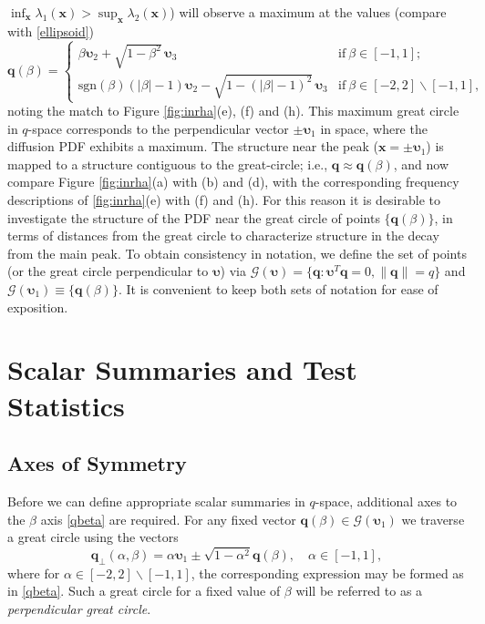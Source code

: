 \documentclass[dvips,aoas,preprint]{imsart}
\numberwithin{equation}{section}
\theoremstyle{plain}
\newcommand{\q}{\mathbf{q}}
\newcommand{\bu}{\bs{\upsilon}}
\newcommand{\x}{\mathbf{x}}
\newcommand{\cG}{\mathcal{G}}
\newcommand{\bs}[1]{\boldsymbol{#1}}
\begin{document}
$\inf_{\x}\lambda_1(\x)>\sup_{\x}\lambda_2(\x)$) will observe a
maximum at the values (compare with \eqref{ellipsoid})
\begin{equation}\label{qbeta}
  \q(\beta) = \left\{
  \begin{array}{ll}
    \beta \bu_2+\sqrt{1-\beta^2}\,\bu_3 & \text{if}~\beta\in[-1,1];\\
    \text{sgn} \left(\beta\right) (|\beta|-1)\bu_2 -
    \sqrt{1-(|\beta|-1)^2}\,  \bu_3 & \text{if}~\beta\in[-2,2]\backslash[-1,1],
  \end{array} \right.
\end{equation}
noting the match to Figure \ref{fig:inrha}(e), (f) and (h).  This
maximum great circle in $q$-space corresponds to the perpendicular
vector $\pm\bu_1$ in space, where the diffusion PDF exhibits a
maximum.  The structure near the peak ($\x=\pm\bu_1$) is mapped to a
structure contiguous to the great-circle; i.e., $\q\approx\q(\beta)$,
and now compare Figure \ref{fig:inrha}(a) with (b) and (d), with the
corresponding frequency descriptions of \ref{fig:inrha}(e) with (f)
and (h).  For this reason it is desirable to investigate the structure
of the PDF near the great circle of points $\{\q(\beta)\}$, in terms
of distances from the great circle to characterize structure in the decay from the main peak.  To obtain consistency in
notation, we define the set of points (or the great circle
perpendicular to $\bu$) via $\cG(\bu)=\{\q:\bu^T\q=0,\|\q\|=q\}$ and
$\cG(\bu_1)\equiv\{\q(\beta)\}$.  It is convenient to keep both sets
of notation for ease of exposition.

\section{Scalar Summaries and Test Statistics}

\subsection{Axes of Symmetry}

Before we can define appropriate scalar summaries in $q$-space,
additional axes to the $\beta$ axis \eqref{qbeta} are required.  For
any fixed vector $\q(\beta)\in\cG(\bu_1)$ we traverse a great circle
using the vectors
\begin{equation}\label{alphabetaplane}
  \q_\perp(\alpha,\beta) = \alpha\bu_1\pm\sqrt{1-\alpha^2}\q(\beta),
  \quad \alpha \in [-1,1],
\end{equation}
where for $\alpha\in\left[-2,2\right]\backslash[-1,1]$, the
corresponding expression may be formed as in \eqref{qbeta}.  Such a
great circle for a fixed value of $\beta$ will be referred to as a
{\em perpendicular great circle}.
\end{document}
